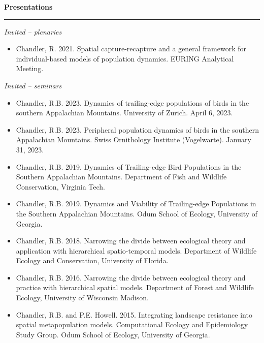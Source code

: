 \vspace{0.5cm}


{\large \bf Presentations} \\
\rule[3mm]{\textwidth}{0.3mm}

\emph{Invited -- plenaries}

\begin{itemize}

\item Chandler, R. 2021. Spatial capture-recapture and a general
  framework for individual-based models of population dynamics.
  EURING Analytical Meeting. 

\end{itemize}  

\emph{Invited -- seminars}

\begin{itemize}

\item Chandler, R.B. 2023. Dynamics of trailing-edge populations of
  birds in the southern Appalachian Mountains. University of
  Zurich. April 6, 2023.

\item Chandler, R.B. 2023. Peripheral population dynamics of birds in
  the southern Appalachian Mountains. Swiss Ornithology Institute
  (Vogelwarte). January 31, 2023.
  
\item Chandler, R.B. 2019. Dynamics of Trailing-edge Bird Populations
  in the Southern Appalachian Mountains. Department of Fish and
  Wildlife Conservation, Virginia Tech.

\item Chandler, R.B. 2019. Dynamics and Viability of Trailing-edge
  Populations in the Southern Appalachian Mountains. Odum School of
  Ecology, University of Georgia.

\item Chandler, R.B. 2018. Narrowing the divide between ecological
  theory and application with hierarchical spatio-temporal
  models. Department of Wildlife Ecology and Conservation, 
  University of Florida.

\item Chandler, R.B. 2016. Narrowing the divide between ecological
  theory and practice with hierarchical spatial models. Department of
  Forest and Wildlife Ecology, University of Wisconsin Madison. 

\item Chandler, R.B. and P.E. Howell. 2015. Integrating landscape
  resistance into spatial metapopulation models. Computational Ecology
  and Epidemiology Study Group. Odum School of Ecology, University of
  Georgia. 


\end{itemize}
